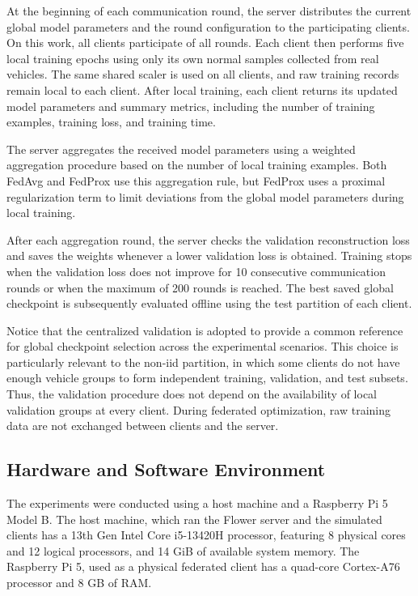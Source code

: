 \documentclass[12pt]{article}
\begin{document}
At the beginning of each communication round, the server distributes the current global model parameters and the round configuration to the participating clients. On this work, all clients participate of all rounds. Each client then performs five local training epochs using only its own normal samples collected from real vehicles. The same shared scaler is used on all clients, and raw training records remain local to each client. After local training, each client returns its updated model parameters and summary metrics, including the number of training examples, training loss, and training time.

The server aggregates the received model parameters using a weighted aggregation procedure based on the number of local training examples. Both FedAvg and FedProx use this aggregation rule, but FedProx uses a proximal regularization term to limit deviations from the global model parameters during local training.

After each aggregation round, the server checks the validation reconstruction loss and saves the weights whenever a lower validation loss is obtained. Training stops when the validation loss does not improve for 10 consecutive communication rounds or when the maximum of 200 rounds is reached. The best saved global checkpoint is subsequently evaluated offline using the test partition of each client.

Notice that the centralized validation is adopted to provide a common reference for global checkpoint selection across the experimental scenarios. This choice is particularly relevant to the non-iid partition, in which some clients do not have enough vehicle groups to form independent training, validation, and test subsets. Thus, the validation procedure does not depend on the availability of local validation groups at every client. During federated optimization, raw training data are not exchanged between clients and the server. 

\subsection{Hardware and Software Environment}

The experiments were conducted using a host machine and a Raspberry Pi 5 Model B. The host machine, which ran the Flower server and the simulated clients has a 13th Gen Intel Core i5-13420H processor, featuring 8 physical cores and 12 logical processors, and 14 GiB of available system memory. The Raspberry Pi 5, used as a physical federated client has a quad-core Cortex-A76 processor and 8 GB of RAM.
\end{document}
